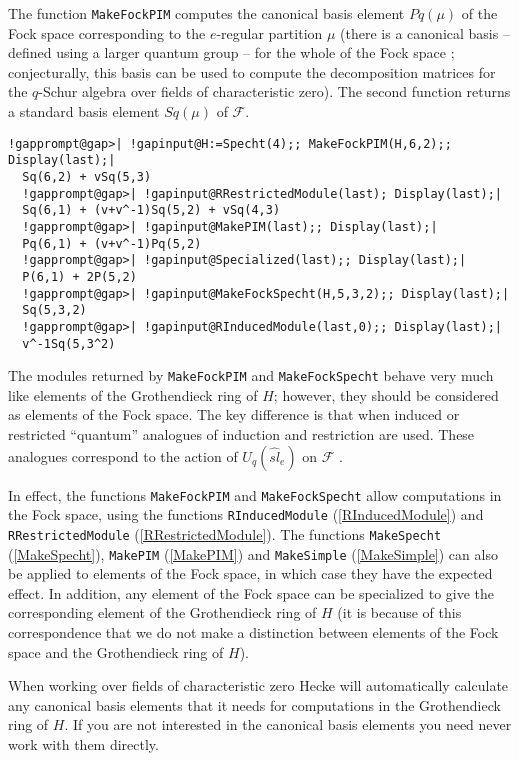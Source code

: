 \documentclass[a4paper,11pt]{report}
\begin{document}
{{{ The function \texttt{MakeFockPIM} computes the canonical basis element $Pq(\mu)$ of the Fock space corresponding to the $e$-regular partition $\mu$ (there is a canonical basis -- defined using a larger quantum group -- for the
whole of the Fock space \cite{LT}; conjecturally, this basis can be used to compute the decomposition matrices
for the $q$-Schur algebra over fields of characteristic zero). The second function
returns a standard basis element $Sq(\mu)$ of $\mathcal{F}$. 
\begin{Verbatim}[commandchars=!@|,fontsize=\small,frame=single,label=Example]
  !gapprompt@gap>| !gapinput@H:=Specht(4);; MakeFockPIM(H,6,2);; Display(last);|
  Sq(6,2) + vSq(5,3)
  !gapprompt@gap>| !gapinput@RRestrictedModule(last); Display(last);|
  Sq(6,1) + (v+v^-1)Sq(5,2) + vSq(4,3)
  !gapprompt@gap>| !gapinput@MakePIM(last);; Display(last);|
  Pq(6,1) + (v+v^-1)Pq(5,2)
  !gapprompt@gap>| !gapinput@Specialized(last);; Display(last);|
  P(6,1) + 2P(5,2)
  !gapprompt@gap>| !gapinput@MakeFockSpecht(H,5,3,2);; Display(last);|
  Sq(5,3,2)
  !gapprompt@gap>| !gapinput@RInducedModule(last,0);; Display(last);|
  v^-1Sq(5,3^2)
\end{Verbatim}
 The modules returned by \texttt{MakeFockPIM} and \texttt{MakeFockSpecht} behave very much like elements of the Grothendieck ring of $H$; however, they should be considered as elements of the Fock space. The key
difference is that when induced or restricted ``quantum'' analogues of induction and restriction are used. These analogues correspond to
the action of $U_q( \widehat{sl}_{e})$ on $\mathcal{F} $ \cite{LLT}.

 In effect, the functions \texttt{MakeFockPIM} and \texttt{MakeFockSpecht} allow computations in the Fock space, using the functions \texttt{RInducedModule} (\ref{RInducedModule}) and \texttt{RRestrictedModule} (\ref{RRestrictedModule}). The functions \texttt{MakeSpecht} (\ref{MakeSpecht}), \texttt{MakePIM} (\ref{MakePIM}) and \texttt{MakeSimple} (\ref{MakeSimple}) can also be applied to elements of the Fock space, in which case they have the
expected effect. In addition, any element of the Fock space can be specialized
to give the corresponding element of the Grothendieck ring of $H$ (it is because of this correspondence that we do not make a distinction
between elements of the Fock space and the Grothendieck ring of $H$).

 When working over fields of characteristic zero \textsf{Hecke} will automatically calculate any canonical basis elements that it needs for
computations in the Grothendieck ring of $H$. If you are not interested in the canonical basis elements you need never
work with them directly. }

}}
\end{document}
